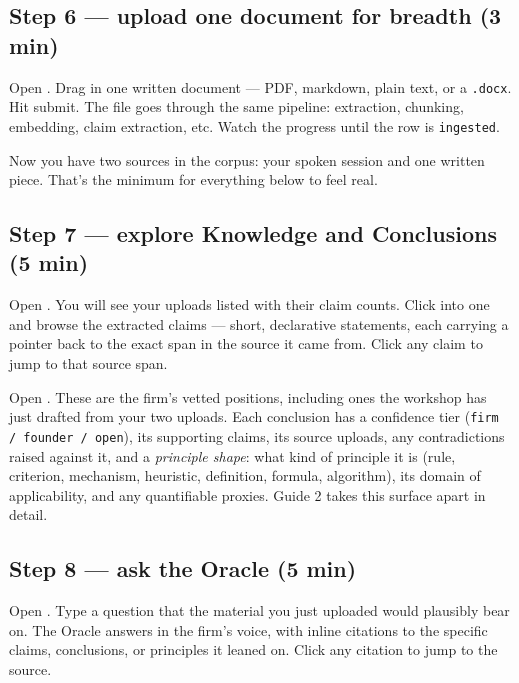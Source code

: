 \documentclass[11pt]{article}
\begin{document}
\subsection{Step 6 --- upload one document for breadth (3 min)}

Open . Drag in one written document --- PDF, markdown,
plain text, or a \texttt{.docx}. Hit submit. The file goes through the
same pipeline: extraction, chunking, embedding, claim extraction, etc.
Watch the progress until the row is \texttt{ingested}.

Now you have two sources in the corpus: your spoken session and one
written piece. That's the minimum for everything below to feel real.

\subsection{Step 7 --- explore Knowledge and Conclusions (5 min)}

Open . You will see your uploads listed with their
claim counts. Click into one and browse the extracted claims ---
short, declarative statements, each carrying a pointer back to the
exact span in the source it came from. Click any claim to jump to
that source span.

Open . These are the firm's vetted positions,
including ones the workshop has just drafted from your two uploads.
Each conclusion has a confidence tier (\texttt{firm / founder /
open}), its supporting claims, its source uploads, any contradictions
raised against it, and a \emph{principle shape}: what kind of
principle it is (rule, criterion, mechanism, heuristic, definition,
formula, algorithm), its domain of applicability, and any
quantifiable proxies. Guide 2 takes this surface apart in detail.


\subsection{Step 8 --- ask the Oracle (5 min)}

Open . Type a question that the material you just uploaded
would plausibly bear on. The Oracle answers in the firm's voice, with
inline citations to the specific claims, conclusions, or principles
it leaned on. Click any citation to jump to the source.
\end{document}
